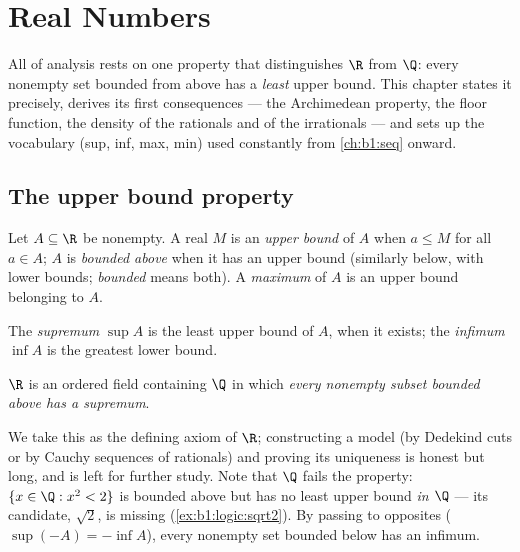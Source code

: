 \chapter{Real Numbers}\label{ch:b1:reals}

All of analysis rests on one property that distinguishes $\R$ from
$\Q$: every nonempty set bounded from above has a \emph{least} upper
bound. This chapter states it precisely, derives its first
consequences --- the Archimedean property, the floor function, the
density of the rationals and of the irrationals --- and sets up the
vocabulary (sup, inf, max, min) used constantly from
\cref{ch:b1:seq} onward.

\section{The upper bound property}

\begin{definition}\label{def:b1:reals:bounds}
Let $A \subseteq \R$ be nonempty. A real $M$ is an \emph{upper
bound} of $A$ when $a \leq M$ for all $a \in A$;
$A$ is \emph{bounded above} when it has an upper bound (similarly
below, with lower bounds; \emph{bounded} means both). A
\emph{maximum} of $A$ is an upper bound belonging to $A$.

The \emph{supremum} $\sup A$ is the least upper bound
of $A$, when it exists; the \emph{infimum} $\inf A$ is
the greatest lower bound.
\end{definition}

\begin{theorem}\label{thm:b1:reals:sup}
$\R$ is an ordered field containing $\Q$ in which \emph{every
nonempty subset bounded above has a supremum}.
\end{theorem}
\admitted

\begin{remark}
We take this as the defining axiom of $\R$; constructing a model (by
Dedekind cuts or by Cauchy sequences of rationals) and proving its
uniqueness is honest but long, and is left for further study. Note
that $\Q$ fails the property: $\{x \in \Q : x^2 < 2\}$ is bounded
above but has no least upper bound \emph{in $\Q$} --- its candidate,
$\sqrt 2$, is missing (\cref{ex:b1:logic:sqrt2}). By passing to
opposites ($\sup(-A) = -\inf A$), every nonempty set bounded below
has an infimum.
\end{remark}

